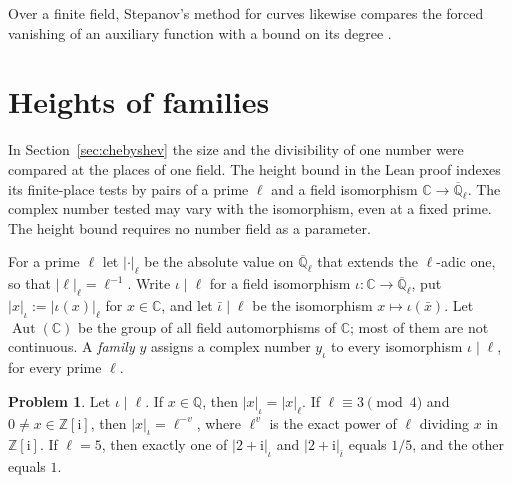 \documentclass[reqno]{amsart}
\theoremstyle{definition}
\newtheorem{problem}{Problem}[section]
\theoremstyle{plain}
\newcommand{\Z}{\mathbb{Z}}
\newcommand{\Q}{\mathbb{Q}}
\newcommand{\C}{\mathbb{C}}
\newcommand{\ii}{\mathrm{i}}
\newcommand{\Qlb}{\overline{\Q}_\ell}
\newcommand{\Aut}{\operatorname{Aut}}
\begin{document}
Over a finite field, Stepanov's method for curves likewise compares the forced vanishing of an auxiliary function with a bound on its degree \cite{Bom}.

\section{Heights of families}\label{sec:heights}

In Section~\ref{sec:chebyshev} the size and the divisibility of one number were compared at the places of one field.  The height bound in the Lean proof \cite{GL} indexes its finite-place tests by pairs of a prime \(\ell\) and a field isomorphism \(\C \to \Qlb\).  The complex number tested may vary with the isomorphism, even at a fixed prime.  The height bound requires no number field as a parameter.

For a prime \(\ell\) let \(\lvert\cdot\rvert_\ell\) be the absolute value on \(\Qlb\) that extends the \(\ell\)-adic one, so that \(\lvert \ell \rvert_\ell = \ell^{-1}\).  Write \(\iota \mid \ell\) for a field isomorphism \(\iota \colon \C \to \Qlb\), put \(\lvert x \rvert_\iota := \lvert \iota(x) \rvert_\ell\) for \(x \in \C\), and let \(\bar\iota \mid \ell\) be the isomorphism \(x \mapsto \iota(\bar x)\).  Let \(\Aut(\C)\) be the group of all field automorphisms of \(\C\); most of them are not continuous.  A \emph{family} \(y\) assigns a complex number \(y_\iota\) to every isomorphism \(\iota \mid \ell\), for every prime \(\ell\).

\begin{problem}\label{pr:iota}
Let \(\iota \mid \ell\).  If \(x \in \Q\), then \(\lvert x \rvert_\iota = \lvert x \rvert_\ell\).  If \(\ell \equiv 3 \pmod 4\) and \(0 \ne x \in \Z[\ii]\), then \(\lvert x \rvert_\iota = \ell^{-v}\), where \(\ell^v\) is the exact power of \(\ell\) dividing \(x\) in \(\Z[\ii]\).  If \(\ell = 5\), then exactly one of \(\lvert 2 + \ii \rvert_\iota\) and \(\lvert 2 + \ii \rvert_{\bar\iota}\) equals \(1/5\), and the other equals \(1\).
\end{problem}
\end{document}

